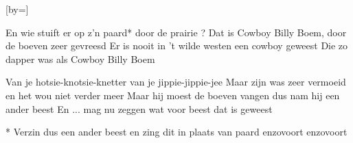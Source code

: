  

[by=]




\beginverse
En wie stuift er op z'n paard* door de prairie ?  
Dat is Cowboy Billy Boem, door de boeven zeer gevreesd
Er is nooit in 't wilde westen een cowboy geweest
Die zo dapper was als Cowboy Billy Boem  
\endverse

\beginchorus
Van je hotsie-knotsie-knetter van je jippie-jippie-jee
Maar zijn  was zeer vermoeid en het wou niet verder meer
Maar hij moest de boeven vangen dus nam hij een ander beest
En ... mag nu zeggen wat voor beest dat is geweest

* Verzin dus een ander beest en zing dit in plaats van paard enzovoort enzovoort 
\endchorus




\endsong
